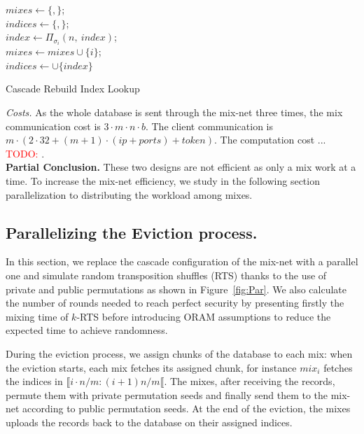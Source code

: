 \documentclass[USenglish,oneside,twocolumn]{article}
\newcommand{\todo}[1]{\textcolor{red}{TODO: #1}}
\begin{document}
\begin{algorithm}
\DontPrintSemicolon
{}
$mixes \gets \{,\}$;\\
$indices \gets \{,\}$;\\
{
	$index \gets {\Pi}_{\sigma_i}(n,\ index)$;\\
	$mixes \gets mixes \cup \{i\}$;\\
	$indices \gets \cup \{index\}$
}
\caption{Cascade Rebuild Index Lookup}
\label{alg:CRIL}
\end{algorithm}

\noindent\textit{Costs.}
As the whole database is sent through the mix-net three times, the mix communication cost is $3\cdot m \cdot n \cdot b$. The client communication is $m \cdot (2 \cdot 32+ (m+1)\cdot (ip +ports)+ token)$.
The  computation cost ... \todo{}.\\

\noindent\textbf{Partial Conclusion.} These two designs are not efficient as only a mix work at a time. To increase the mix-net efficiency, we study in the following section parallelization to distributing the workload among mixes.
% 
\subsection{Parallelizing the Eviction process.}\label{Parallel}
In this section, we replace the cascade configuration of the mix-net with a parallel one and simulate random transposition shuffles (RTS) thanks to the use of private and public permutations as shown in Figure~\ref{fig:Par}. We also calculate the number of rounds needed to reach perfect security by presenting firstly the mixing time of $k$-RTS before introducing ORAM assumptions to reduce the expected time to achieve randomness.

During the eviction process, we assign chunks of the database to each mix: when the eviction starts, each mix fetches its assigned chunk, for instance $mix_i$ fetches the indices in $\llbracket i\cdot n/m : (i+1)n/m \llbracket$. The mixes, after receiving the records, permute them with private permutation seeds and finally send them to the mix-net according to public permutation seeds. At the end of the eviction, the mixes uploads the records back to the database on their assigned indices.
\end{document}
